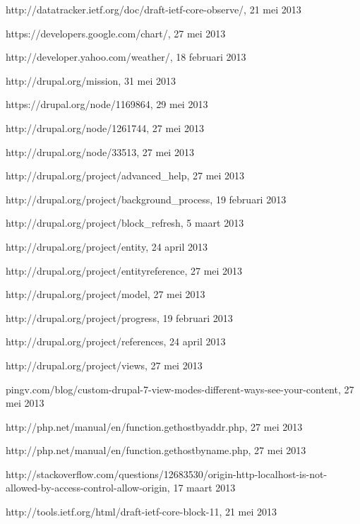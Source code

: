 \begin{thebibliography}{99}
 http://datatracker.ietf.org/doc/draft-ietf-core-observe/, 21 mei 2013

 https://developers.google.com/chart/, 27 mei 2013

 http://developer.yahoo.com/weather/, 18 februari 2013

 http://drupal.org/mission, 31 mei 2013

 https://drupal.org/node/1169864, 29 mei 2013

 http://drupal.org/node/1261744, 27 mei 2013

 http://drupal.org/node/33513, 27 mei 2013

 http://drupal.org/project/advanced\_help, 27 mei 2013

 http://drupal.org/project/background\_process, 19 februari 2013

 http://drupal.org/project/block\_refresh, 5 maart 2013

 http://drupal.org/project/entity, 24 april 2013

 http://drupal.org/project/entityreference, 27 mei 2013

 http://drupal.org/project/model, 27 mei 2013

 http://drupal.org/project/progress, 19 februari 2013

 http://drupal.org/project/references, 24 april 2013

 http://drupal.org/project/views, 27 mei 2013

 pingv.com/blog/custom-drupal-7-view-modes-different-ways-see-your-content, 27 mei 2013

 http://php.net/manual/en/function.gethostbyaddr.php, 27 mei 2013

 http://php.net/manual/en/function.gethostbyname.php, 27 mei 2013

 http://stackoverflow.com/questions/12683530/origin-http-localhost-is-not-allowed-by-access-control-allow-origin, 17 maart 2013

 http://tools.ietf.org/html/draft-ietf-core-block-11, 21 mei 2013


\end{thebibliography}

